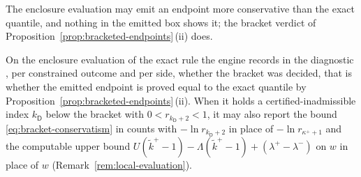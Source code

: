 
The enclosure evaluation may emit an endpoint more conservative than the
exact quantile, and nothing in the emitted box shows it; the bracket verdict
of Proposition~\ref{prop:bracketed-endpoints}\,(ii) does.

\begin{requirement}\label{req:endpoint-exact-record}
On the enclosure evaluation of the exact rule the engine records in the
diagnostic , per constrained outcome and per side,
whether the bracket was decided, that is whether the emitted endpoint is
proved equal to the exact quantile by
Proposition~\ref{prop:bracketed-endpoints}\,(ii). When it holds a
certified-inadmissible index $k_{\mathsf{D}}$ below the bracket with
$0<r_{k_{\mathsf{D}}+2}<1$, it may also report the bound
\eqref{eq:bracket-conservatism} in counts with $-\ln r_{k_{\mathsf{D}}+2}$ in
place of $-\ln r_{\kappa^{+}+1}$ and the computable upper bound
$U(\tilde k^{+}-1)-\Lambda(\tilde k^{+}-1)+(\lambda^{+}-\lambda^{-})$ on $w$
in place of $w$ (Remark~\ref{rem:local-evaluation}).
\end{requirement}
